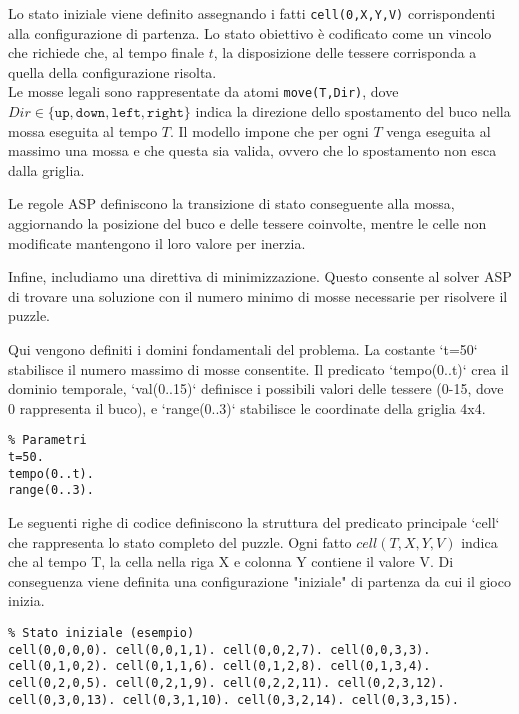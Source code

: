 Lo stato iniziale viene definito assegnando i fatti \texttt{cell(0,X,Y,V)} corrispondenti alla configurazione di partenza. Lo stato obiettivo è codificato come un vincolo che richiede che, al tempo finale \( t \), la disposizione delle tessere corrisponda a quella della configurazione risolta. \\

Le mosse legali sono rappresentate da atomi \texttt{move(T,Dir)}, dove \( Dir \in \{\texttt{up}, \texttt{down}, \texttt{left}, \texttt{right}\} \) indica la direzione dello spostamento del buco nella mossa eseguita al tempo \( T \). Il modello impone che per ogni \( T \) venga eseguita al massimo una mossa e che questa sia valida, ovvero che lo spostamento non esca dalla griglia.

Le regole ASP definiscono la transizione di stato conseguente alla mossa, aggiornando la posizione del buco e delle tessere coinvolte, mentre le celle non modificate mantengono il loro valore per inerzia.

Infine, includiamo una direttiva di minimizzazione.
Questo consente al solver ASP di trovare una soluzione con il numero minimo di mosse necessarie per risolvere il puzzle.

Qui vengono definiti i domini fondamentali del problema. La costante `t=50` stabilisce il numero massimo di mosse consentite. Il predicato `tempo(0..t)` crea il dominio temporale, `val(0..15)` definisce i possibili valori delle tessere (0-15, dove 0 rappresenta il buco), e `range(0..3)` stabilisce le coordinate della griglia 4x4.

\begin{verbatim}
% Parametri
t=50.
tempo(0..t).
range(0..3).
\end{verbatim}

Le seguenti righe di codice definiscono la struttura del predicato principale `cell` che rappresenta lo stato completo del puzzle. Ogni fatto $cell(T,X,Y,V)$ indica che al tempo T, la cella nella riga X e colonna Y contiene il valore V.
Di conseguenza viene definita una configurazione "iniziale" di partenza da cui il gioco inizia.

\begin{verbatim}
% Stato iniziale (esempio)
cell(0,0,0,0). cell(0,0,1,1). cell(0,0,2,7). cell(0,0,3,3).
cell(0,1,0,2). cell(0,1,1,6). cell(0,1,2,8). cell(0,1,3,4).
cell(0,2,0,5). cell(0,2,1,9). cell(0,2,2,11). cell(0,2,3,12).
cell(0,3,0,13). cell(0,3,1,10). cell(0,3,2,14). cell(0,3,3,15).

\end{verbatim}

